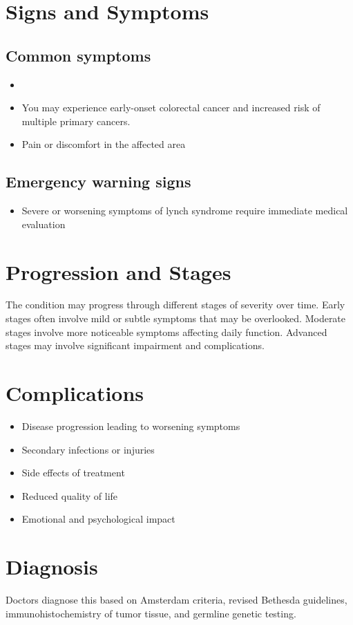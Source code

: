 \section{Signs and Symptoms}

\subsection{Common symptoms}
\begin{itemize}[noitemsep]
  \item \item You may experience early-onset colorectal cancer and increased risk of multiple primary cancers.

  \item Pain or discomfort in the affected area
  \end{itemize}

\subsection{Emergency warning signs}
\begin{itemize}[noitemsep]
  \item Severe or worsening symptoms of lynch syndrome require immediate medical evaluation
\end{itemize}
\section{Progression and Stages}
The condition may progress through different stages of severity over time. Early stages often involve mild or subtle symptoms that may be overlooked. Moderate stages involve more noticeable symptoms affecting daily function. Advanced stages may involve significant impairment and complications.
\section{Complications}
\begin{itemize}[noitemsep]
  \item Disease progression leading to worsening symptoms
  \item Secondary infections or injuries
  \item Side effects of treatment
  \item Reduced quality of life
  \item Emotional and psychological impact
\end{itemize}
\section{Diagnosis}
Doctors diagnose this based on Amsterdam criteria, revised Bethesda guidelines, immunohistochemistry of tumor tissue, and germline genetic testing.

